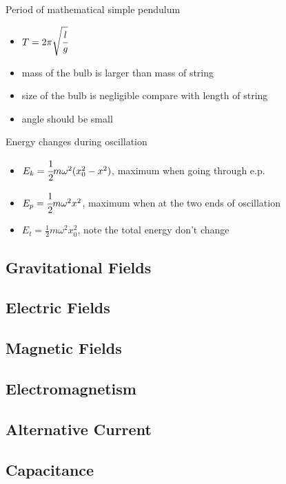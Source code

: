 \documentclass[]{article}
\begin{document}
Period of mathematical simple pendulum

\begin{itemize}
\item
  \(T  = 2\pi \sqrt{\cfrac{l}{g}}\)
\item
  mass of the bulb is larger than mass of string
\item
  size of the bulb is negligible compare with length of string
\item
  angle should be small
\end{itemize}

Energy changes during oscillation

\begin{itemize}
\item
  \(E_k = \cfrac{1}{2}m\omega^2(x_0^2 - x^2)\), maximum when going
  through e.p.
\item
  \(E_p = \cfrac{1}{2}m\omega^2x^2\), maximum when at the two ends of
  oscillation
\item
  \(E_t = \frac{1}{2}m\omega^2x_0^2\), note the total energy don't
  change
\end{itemize}

\subsection{Gravitational Fields}\label{header-n126}

\subsection{Electric Fields}\label{header-n128}

\subsection{Magnetic Fields}\label{header-n130}

\subsection{Electromagnetism}\label{header-n132}

\subsection{Alternative Current}\label{header-n134}

\subsection{Capacitance}\label{header-n136}
\end{document}
